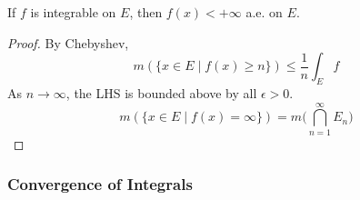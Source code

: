   \begin{theorem}
    \label{thm:integrable-functions-can-be-infinite-on-at-most}
    If $f$ is integrable on $E$, then $f(x) < +\infty$ a.e. on $E$. 
  \end{theorem}
  \begin{proof}
    By Chebyshev, 
    \begin{equation}
      m( \{x \in E \mid f(x) \geq n \}) \leq \frac{1}{n} \int_E f 
    \end{equation}
    As $n \to \infty$, the LHS is bounded above by all $\epsilon > 0$. 
    \begin{equation}
      m( \{x \in E \mid f(x) = \infty \}) = m \bigg( \bigcap_{n=1}^\infty E_n \bigg)
    \end{equation}
  \end{proof} 

\subsubsection{Convergence of Integrals}

